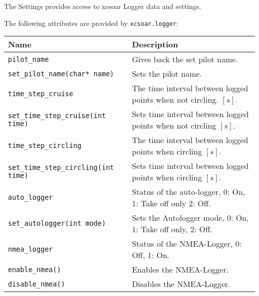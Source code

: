 The Settings provides access to xcsoar Logger data and settings.

The following attributes are provided by \verb|xcsoar.logger|:

\begin{maxipage}
\begin{tabularx}{1.9\textwidth}{l|X}
Name & Description \\
\hline\hline

\verb|pilot_name| & Gives back the set pilot name.\\

\hline

\verb|set_pilot_name(char* name)| &  Sets the pilot name.\\

\hline

\verb|time_step_cruise| & The time interval between logged
points when not circling. $[s]$.\\

\hline

\verb|set_time_step_cruise(int time)| &  Sets time interval between logged
points when not circling $[s]$.\\

\hline

\verb|time_step_circling| &  The time interval between logged
points when circling $[s]$.\\

\hline

\verb|set_time_step_circling(int time)| &  Sets time interval between logged
points when circling $[s]$.\\

\hline

\verb|auto_logger| &  Status of the auto-logger, 0: On, 1: Take off only
2: Off.\\

\hline

\verb|set_autologger(int mode)| &  Sets the Autologger mode, 0: On,
1: Take off only, 2: Off.\\

\hline

\verb|nmea_logger| &  Status of the NMEA-Logger, 0: Off, 1: On.\\

\hline

\verb|enable_nmea()| &  Enables the NMEA-Logger.\\

\hline

\verb|disable_nmea()| &  Disables the NMEA-Logger.\\


\end{tabularx}
\end{maxipage}
